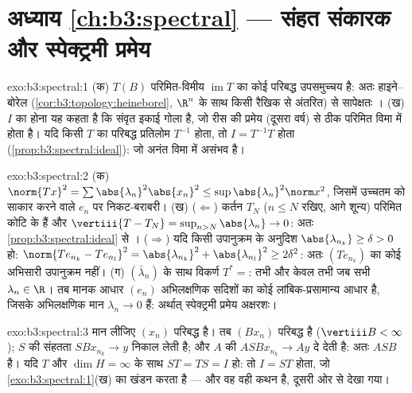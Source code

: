 \section*{अध्याय \ref{ch:b3:spectral} --- संहत संकारक और
स्पेक्ट्रमी प्रमेय}

\begin{solution}{exo:b3:spectral:1}
(क) $T(B)$ परिमित-विमीय $\operatorname{im}T$ का कोई परिबद्ध उपसमुच्चय है: अतः
हाइने--बोरेल (\cref{cor:b3:topology:heineborel}, $\R^n$ के साथ किसी रैखिक  से अंतरित) से
सापेक्षतः ।
(ख) $I$ का  होना यह कहता है कि संवृत इकाई गोला  है, जो रीस
की प्रमेय (दूसरा वर्ष) से ठीक परिमित विमा में होता है। यदि किसी 
$T$ का परिबद्ध प्रतिलोम $T^{-1}$ होता, तो $I = T^{-1}T$  होता (\cref{prop:b3:spectral:ideal}): जो अनंत
विमा में असंभव है।
\end{solution}

\begin{solution}{exo:b3:spectral:2}
(क) $\norm{Tx}^2 = \sum\abs{\lambda_n}^2\abs{x_n}^2 \leq
\sup\abs{\lambda_n}^2\norm x^2$, जिसमें उच्चतम को साकार करने वाले $e_n$ पर निकट-बराबरी।
(ख) ($\Leftarrow$) कर्तन $T_N$ ($n \leq N$ रखिए, आगे शून्य) परिमित कोटि के हैं और
$\vertiii{T - T_N} =
\sup_{n>N}\abs{\lambda_n} \to 0$: अतः \cref{prop:b3:spectral:ideal} से । ($\Rightarrow$) यदि किसी उपानुक्रम के अनुदिश $\abs{\lambda_{n_k}} \geq \delta > 0$ हो:
$\norm{Te_{n_k} - Te_{n_l}}^2 = \abs{\lambda_{n_k}}^2 +
\abs{\lambda_{n_l}}^2 \geq 2\delta^2$: अतः $(Te_{n_k})$ का कोई अभिसारी उपानुक्रम नहीं।
(ग) $(\bar\lambda_n)$ के साथ विकर्ण $T^* ={}$:  तभी और केवल तभी जब सभी $\lambda_n \in \R$।
तब मानक आधार $(e_n)$ अभिलक्षणिक सदिशों का कोई लांबिक-प्रसामान्य आधार
है, जिसके अभिलक्षणिक मान $\lambda_n \to
0$ हैं: अर्थात् स्पेक्ट्रमी प्रमेय अक्षरशः।
\end{solution}

\begin{solution}{exo:b3:spectral:3}
मान लीजिए $(x_n)$ परिबद्ध है। तब $(Bx_n)$ परिबद्ध है ($\vertiii B < \infty$); $S$ की संहतता
$SBx_{n_k} \to y$ निकाल लेती है; और $A$ की  $ASBx_{n_k} \to
Ay$ दे देती है: अतः $ASB$
 है। यदि  $T$ और $\dim H = \infty$ के साथ $ST = TS = I$ हो: तो $I = ST$  होता,
जो \cref{exo:b3:spectral:1}(ख) का खंडन करता है --- और वह वही कथन है, दूसरी ओर से देखा
गया।
\end{solution}

